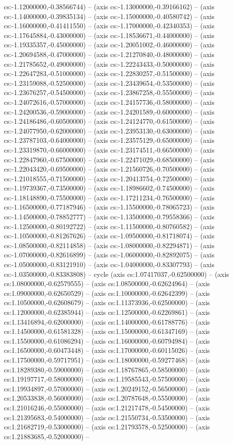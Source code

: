 cs:-1.12000000,-0.38566744) -- (axis cs:-1.13000000,-0.39166162) -- (axis cs:-1.14000000,-0.39835134) -- (axis cs:-1.15000000,-0.40580742) -- (axis cs:-1.16000000,-0.41411550) -- (axis cs:-1.17000000,-0.42340353) -- (axis cs:-1.17645884,-0.43000000) -- (axis cs:-1.18536671,-0.44000000) -- (axis cs:-1.19335357,-0.45000000) -- (axis cs:-1.20051002,-0.46000000) -- (axis cs:-1.20694588,-0.47000000) -- (axis cs:-1.21270840,-0.48000000) -- (axis cs:-1.21785652,-0.49000000) -- (axis cs:-1.22243433,-0.50000000) -- (axis cs:-1.22647283,-0.51000000) -- (axis cs:-1.22830257,-0.51500000) -- (axis cs:-1.23159088,-0.52500000) -- (axis cs:-1.23439654,-0.53500000) -- (axis cs:-1.23676257,-0.54500000) -- (axis cs:-1.23867258,-0.55500000) -- (axis cs:-1.24072616,-0.57000000) -- (axis cs:-1.24157736,-0.58000000) -- (axis cs:-1.24200536,-0.59000000) -- (axis cs:-1.24201589,-0.60000000) -- (axis cs:-1.24186486,-0.60500000) -- (axis cs:-1.24124770,-0.61500000) -- (axis cs:-1.24077950,-0.62000000) -- (axis cs:-1.23953130,-0.63000000) -- (axis cs:-1.23787103,-0.64000000) -- (axis cs:-1.23575129,-0.65000000) -- (axis cs:-1.23319870,-0.66000000) -- (axis cs:-1.23174511,-0.66500000) -- (axis cs:-1.22847960,-0.67500000) -- (axis cs:-1.22471029,-0.68500000) -- (axis cs:-1.22043420,-0.69500000) -- (axis cs:-1.21560726,-0.70500000) -- (axis cs:-1.21018555,-0.71500000) -- (axis cs:-1.20413754,-0.72500000) -- (axis cs:-1.19739367,-0.73500000) -- (axis cs:-1.18986602,-0.74500000) -- (axis cs:-1.18148890,-0.75500000) -- (axis cs:-1.17211234,-0.76500000) -- (axis cs:-1.16500000,-0.77187946) -- (axis cs:-1.15500000,-0.78065723) -- (axis cs:-1.14500000,-0.78852777) -- (axis cs:-1.13500000,-0.79558366) -- (axis cs:-1.12500000,-0.80192722) -- (axis cs:-1.11500000,-0.80760582) -- (axis cs:-1.10500000,-0.81267626) -- (axis cs:-1.09500000,-0.81718074) -- (axis cs:-1.08500000,-0.82114858) -- (axis cs:-1.08000000,-0.82294871) -- (axis cs:-1.07000000,-0.82616899) -- (axis cs:-1.06000000,-0.82892075) -- (axis cs:-1.05000000,-0.83121910) -- (axis cs:-1.04000000,-0.83307793) -- (axis cs:-1.03500000,-0.83383808) -- cycle (axis cs:1.07417037,-0.62500000) -- (axis cs:1.08000000,-0.62579555) -- (axis cs:1.08500000,-0.62624964) -- (axis cs:1.09000000,-0.62650529) -- (axis cs:1.10000000,-0.62642399) -- (axis cs:1.10500000,-0.62608679) -- (axis cs:1.11373936,-0.62500000) -- (axis cs:1.12000000,-0.62385944) -- (axis cs:1.12500000,-0.62269861) -- (axis cs:1.13416894,-0.62000000) -- (axis cs:1.14000000,-0.61788776) -- (axis cs:1.14500000,-0.61581328) -- (axis cs:1.15000000,-0.61347169) -- (axis cs:1.15500000,-0.61086294) -- (axis cs:1.16000000,-0.60794984) -- (axis cs:1.16500000,-0.60473448) -- (axis cs:1.17000000,-0.60115026) -- (axis cs:1.17500000,-0.59717951) -- (axis cs:1.18000000,-0.59277468) -- (axis cs:1.18289380,-0.59000000) -- (axis cs:1.18767865,-0.58500000) -- (axis cs:1.19197717,-0.58000000) -- (axis cs:1.19585543,-0.57500000) -- (axis cs:1.19934897,-0.57000000) -- (axis cs:1.20249152,-0.56500000) -- (axis cs:1.20533838,-0.56000000) -- (axis cs:1.20787648,-0.55500000) -- (axis cs:1.21016246,-0.55000000) -- (axis cs:1.21217478,-0.54500000) -- (axis cs:1.21395683,-0.54000000) -- (axis cs:1.21550734,-0.53500000) -- (axis cs:1.21682719,-0.53000000) -- (axis cs:1.21793578,-0.52500000) -- (axis cs:1.21883685,-0.52000000) -- 